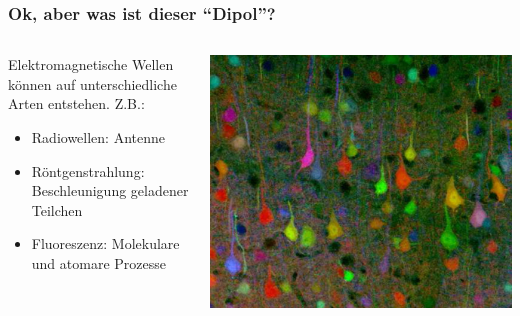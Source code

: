 \documentclass{beamer}
\begin{document}
\begin{frame}
\frametitle{Ok, aber was ist dieser ``Dipol''?}


\begin{columns}[c]
\begin{column}{5cm}
Elektromagnetische Wellen können auf unterschiedliche Arten entstehen. Z.B.:\\
\begin{itemize}
\item
Radiowellen: Antenne 
\item
Röntgenstrahlung: Beschleunigung geladener Teilchen 
\item
Fluoreszenz: Molekulare und atomare Prozesse
\end{itemize}
\end{column}


\begin{column}{5cm}
\begin{center}
\includegraphics[width=\textwidth]{Brainbow.jpg}
\end{center}


\end{column}

\end{columns}

\end{frame}
\end{document}
